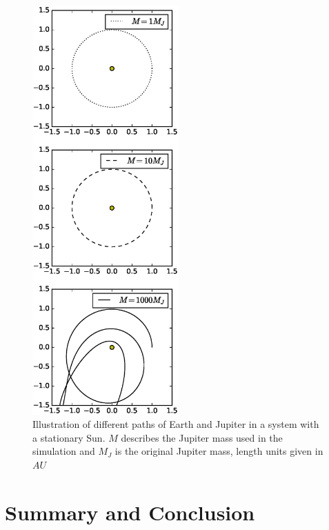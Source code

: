 \documentclass[twoside,twocolumn]{article}
\begin{document}
\begin{figure}[p]
\includegraphics[trim={0 2.5cm 0 2.5cm},width=0.5\textwidth, clip]{figures/earthJup.eps} 
		\caption{Illustration of different paths of Earth and Jupiter in a system with a stationary Sun. $M$ describes the Jupiter mass used in the simulation and $M_J$ is the original Jupiter mass, length units given in $AU$}\label{fig:earth_vel}
\end{figure}
\section{Summary and Conclusion}
\label{sec:conclusion}
	
	
	
\end{document}
